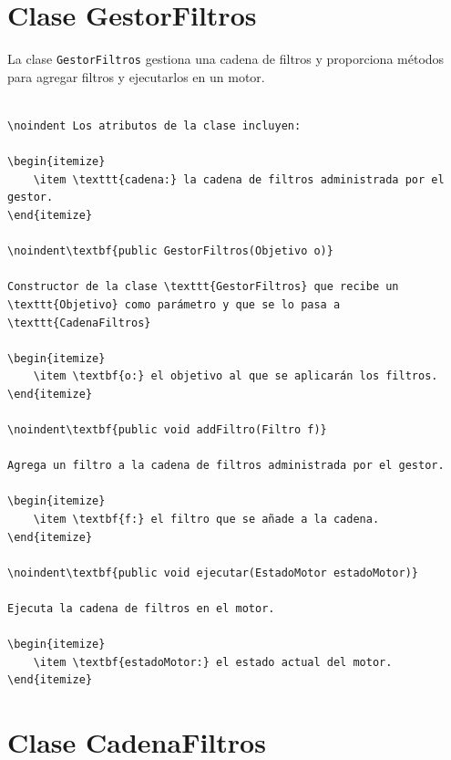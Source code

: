 \documentclass{article}
\begin{document}
\section{Clase GestorFiltros}

La clase \texttt{GestorFiltros} gestiona una cadena de filtros y proporciona métodos para agregar filtros y ejecutarlos en un motor.

\begin{lstlisting}

\noindent Los atributos de la clase incluyen:

\begin{itemize}
    \item \texttt{cadena:} la cadena de filtros administrada por el gestor.
\end{itemize}

\noindent\textbf{public GestorFiltros(Objetivo o)}

Constructor de la clase \texttt{GestorFiltros} que recibe un \texttt{Objetivo} como parámetro y que se lo pasa a \texttt{CadenaFiltros} 

\begin{itemize}
    \item \textbf{o:} el objetivo al que se aplicarán los filtros.
\end{itemize}

\noindent\textbf{public void addFiltro(Filtro f)}

Agrega un filtro a la cadena de filtros administrada por el gestor.

\begin{itemize}
    \item \textbf{f:} el filtro que se añade a la cadena.
\end{itemize}

\noindent\textbf{public void ejecutar(EstadoMotor estadoMotor)}

Ejecuta la cadena de filtros en el motor.

\begin{itemize}
    \item \textbf{estadoMotor:} el estado actual del motor.
\end{itemize}

\end{lstlisting}


\section{Clase CadenaFiltros}
\end{document}

